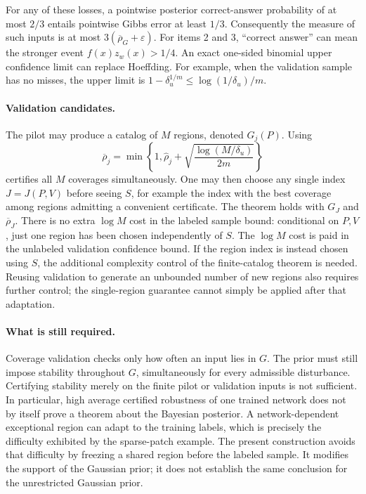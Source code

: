 For any of these losses, a pointwise posterior correct-answer probability
of at most $2/3$ entails pointwise Gibbs error at least $1/3$.
Consequently the measure of such inputs is at most
$3(\overline\rho_G+\varepsilon)$. For items 2 and 3, ``correct answer''
can mean the stronger event $f(x)z_w(x)>1/4$.
An exact one-sided binomial upper confidence limit can replace Hoeffding.
For example, when the validation sample has no misses, the upper limit is
$1-\delta_u^{1/m}\le\log(1/\delta_u)/m$.

\paragraph{Validation candidates.}
The pilot may produce a catalog of $M$ regions, denoted $G_j(P)$.
Using
\[
 \overline\rho_j=\min\!\left\{1,\widehat\rho_j+
              \sqrt{\frac{\log(M/\delta_u)}{2m}}\right\}
\]
certifies all $M$ coverages simultaneously. One may then choose any single
index $J=J(P,V)$ before seeing $S$, for example the index with the best
coverage among regions admitting a convenient certificate. The theorem
holds with $G_J$ and $\overline\rho_J$. There is no extra $\log M$ cost in
the labeled sample bound: conditional on $P,V$, just one region has been
chosen independently of $S$. The $\log M$ cost is paid in the unlabeled
validation confidence bound. If the region index is instead chosen using
$S$, the additional complexity control of the finite-catalog theorem is
needed. Reusing validation to generate an unbounded number of new regions
also requires further control; the single-region guarantee cannot simply
be applied after that adaptation.

\paragraph{What is still required.}
Coverage validation checks only how often an input lies in $G$. The prior
must still impose stability throughout $G$, simultaneously for every
admissible disturbance. Certifying stability merely on the finite pilot or
validation inputs is not sufficient. In particular, high average certified
robustness of one trained network does not by itself prove a theorem about
the Bayesian posterior. A network-dependent exceptional region can adapt
to the training labels, which is precisely the difficulty exhibited by the
sparse-patch example. The present construction avoids that difficulty by
freezing a shared region before the labeled sample. It modifies the support
of the Gaussian prior; it does not establish the same conclusion for the
unrestricted Gaussian prior.
